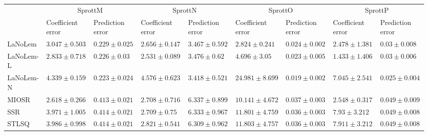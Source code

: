 \begin{table*}
{\begin{tabular}{lllllllll}
 & \multicolumn{2}{c}{SprottM} & \multicolumn{2}{c}{SprottN} & \multicolumn{2}{c}{SprottO} & \multicolumn{2}{c}{SprottP} \\
 & Coefficient error & Prediction error & Coefficient error & Prediction error & Coefficient error & Prediction error & Coefficient error & Prediction error \\
\midrule
LaNoLem & $3.047\pm 0.503$ & $0.229\pm 0.025$ & $2.656\pm 0.147$ & $3.467\pm 0.592$ & $\mathbf{2.824}\pm 0.241$ & $0.024\pm 0.002$ & $2.478\pm 1.381$ & $0.03\pm 0.008$ \\
LaNoLem-L & $2.833\pm 0.718$ & $0.226\pm 0.03$ & $\mathbf{2.531}\pm 0.089$ & $3.476\pm 0.62$ & $4.696\pm 3.05$ & $0.023\pm 0.005$ & $\mathbf{1.433}\pm 1.406$ & $0.03\pm 0.006$ \\
LaNoLem-N & $4.339\pm 0.159$ & $\mathbf{0.223}\pm 0.024$ & $4.576\pm 0.623$ & $\mathbf{3.418}\pm 0.521$ & $24.981\pm 8.699$ & $\mathbf{0.019}\pm 0.002$ & $7.045\pm 2.541$ & $\mathbf{0.025}\pm 0.004$ \\
MIOSR & $\mathbf{2.618}\pm 0.266$ & $0.413\pm 0.021$ & $2.708\pm 0.716$ & $6.337\pm 0.899$ & $10.141\pm 4.672$ & $0.037\pm 0.003$ & $2.548\pm 0.317$ & $0.049\pm 0.009$ \\
SSR & $3.971\pm 1.005$ & $0.414\pm 0.021$ & $2.709\pm 0.75$ & $6.333\pm 0.967$ & $11.801\pm 4.759$ & $0.036\pm 0.003$ & $7.93\pm 3.212$ & $0.049\pm 0.008$ \\
STLSQ & $3.986\pm 0.998$ & $0.414\pm 0.021$ & $2.821\pm 0.541$ & $6.309\pm 0.962$ & $11.803\pm 4.757$ & $0.036\pm 0.003$ & $7.911\pm 3.212$ & $0.049\pm 0.008$ \\

\midrule


\end{tabular}}
\end{table*}
